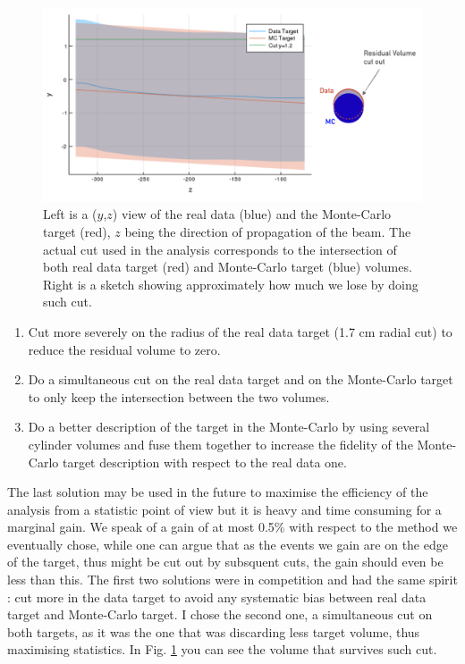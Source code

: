 \begin{figure}[!h]
	\includegraphics[scale=0.4]{./gfx/Targetcut.png}
	\caption{Left is a ($y$,$z$) view of the real data (blue) and the Monte-Carlo target (red), $z$ being the direction of propagation of the beam. The actual cut used in the analysis corresponds to the intersection of both real data target (red) and Monte-Carlo target (blue) volumes. Right is a sketch showing approximately how much we lose by doing such cut.}
	\label{pic:Target}
\end{figure}

\begin{enumerate}
  \item Cut more severely on the radius of the real data target (1.7 cm radial cut) to reduce the  residual volume to zero.
  \item Do a simultaneous cut on the real data target and on the Monte-Carlo target to only keep the intersection between the two volumes.
  \item Do a better description of the target in the Monte-Carlo by using several cylinder volumes and fuse them together to increase the fidelity of the Monte-Carlo target description with respect to the real data one.
\end{enumerate}

The last solution may be used in the future to maximise the efficiency of the analysis from a statistic point of view but it is heavy and time consuming for a marginal gain. We speak of a gain of at most 0.5\% with respect to the method we eventually chose, while one can argue that as the events we gain are on the edge of the target, thus might be cut out by subsquent cuts, the gain should even be less than this.
The first two solutions were in competition and had the same spirit : cut more in the data target to avoid any systematic bias between real data target and Monte-Carlo target. I chose the second one, a simultaneous cut on both targets, as it was the one that was discarding less target volume, thus maximising statistics. In Fig. \ref{pic:Target} you can see the volume that survives such cut.

